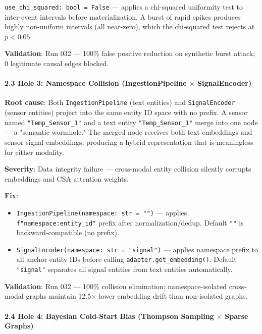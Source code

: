 \documentclass[10pt,journal,compsoc]{IEEEtran}
\begin{document}
\texttt{use\_chi\_squared: bool = False} — applies a chi-squared uniformity test to inter-event intervals before mater\-ialization. A burst of rapid spikes produces highly non-uniform intervals (all near-zero), which the chi-squared test rejects at $p < 0.05$.

\textbf{Validation}: Run 032 — 100\% false positive reduction on synthetic burst attack; 0 legitimate causal edges blocked.

\paragraph{2.3 Hole 3: Namespace Collision (IngestionPipeline $\times$ SignalEncoder)}

\textbf{Root cause}: Both \texttt{IngestionPipeline} (text entities) and \texttt{SignalEncoder} (sensor entities) project into the same entity ID space with no prefix. A sensor named \texttt{"Temp\_Sensor\_1"} and a text entity \texttt{"Temp\_Sensor\_1"} merge into one node — a "semantic wormhole." The merged node receives both text embeddings and sensor signal embeddings, producing a hybrid repre\-sentation that is meaningless for either modality.

\textbf{Severity}: Data integrity failure — cross-modal entity collision silently corrupts embeddings and CSA attention weights.

\textbf{Fix}:
\begin{itemize}
\item \texttt{IngestionPipeline(namespace: str = "")} — applies \texttt{f"{namespace}:{entity\_id}"} prefix after norma\-lization/dedup. Default \texttt{""} is backward-compatible (no prefix).
\item \texttt{SignalEncoder(namespace: str = "signal")} — applies namespace prefix to all anchor entity IDs before calling \texttt{adapter.get\_embedding()}. Default \texttt{"signal"} separates all signal entities from text entities autom\-atically.

\end{itemize}
\textbf{Validation}: Run 032 — 100\% collision elimination; namespace-isolated cross-modal graphs maintain 12.5$\times$ lower embedding drift than non-isolated graphs.

\paragraph{2.4 Hole 4: Bayesian Cold-Start Bias (Thompson Sampling $\times$ Sparse Graphs)}
\end{document}
